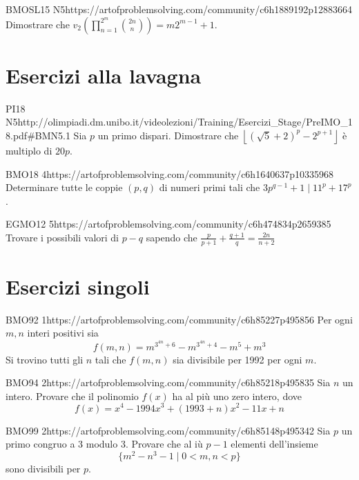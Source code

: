 \documentclass[12pt]{article}
\begin{document}
\begin{esercizio}{BMOSL15 N5}{https://artofproblemsolving.com/community/c6h1889192p12883664}
    Dimostrare che $v_2\left(\prod_{n=1}^{2^m}\binom{2n}{n}\right)=m2^{m-1}+1$.
\end{esercizio}


\section{Esercizi alla lavagna}

\begin{esercizio}{PI18 N5}{http://olimpiadi.dm.unibo.it/videolezioni/Training/Esercizi_Stage/PreIMO_18.pdf\#BMN5.1}
    Sia $p$ un primo dispari. Dimostrare che $\left\lfloor (\sqrt5+2)^p-2^{p+1} \right\rfloor$ è multiplo di $20p$.
\end{esercizio}

\begin{esercizio}{BMO18 4}{https://artofproblemsolving.com/community/c6h1640637p10335968}
    Determinare tutte le coppie $(p,q)$ di numeri primi tali che $3p^{q-1}+1\mid11^p+17^p$.
\end{esercizio}

\begin{esercizio}{EGMO12 5}{https://artofproblemsolving.com/community/c6h474834p2659385}
    Trovare i possibili valori di $p-q$ sapendo che $\frac{p}{p+1}+\frac{q+1}{q}=\frac{2n}{n+2}$
\end{esercizio}

\section{Esercizi singoli}

\begin{esercizio}{BMO92 1}{https://artofproblemsolving.com/community/c6h85227p495856}
Per ogni $m,n$ interi positivi sia
\[f(m,n)=m^{3^{4n}+6}-m^{3^{4n}+4}-m^{5}+m^{3}\]
Si trovino tutti gli $n$ tali che $f(m,n)$ sia divisibile per 1992 per ogni $m$.
\end{esercizio}

\begin{esercizio}{BMO94 2}{https://artofproblemsolving.com/community/c6h85218p495835}
Sia $n$ un intero. Provare che il polinomio $f(x)$ ha al più uno zero intero, dove
\[f(x)=x^{4}-1994x^{3}+(1993+n)x^{2}-11x+n\]
\end{esercizio}

\begin{esercizio}{BMO99 2}{https://artofproblemsolving.com/community/c6h85148p495342}
Sia $p$ un primo congruo a 3 modulo 3. Provare che al iù $p-1$ elementi dell'insieme 
\[\{m^{2}-n^{3}-1\mid 0<m,n<p\}\]
sono divisibili per $p$.
\end{esercizio}
\end{document}
